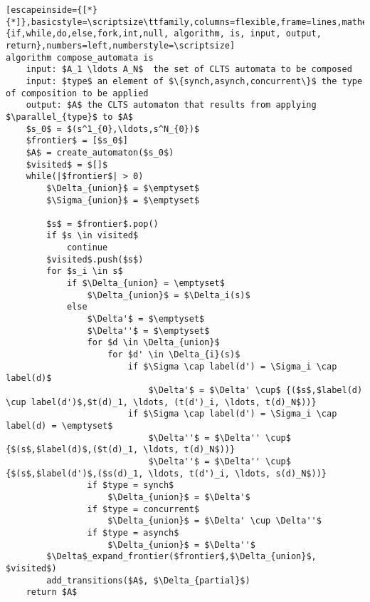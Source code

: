 \renewcommand{\ttdefault}{pcr}
\begin{lstlisting}[escapeinside={[*}{*]},basicstyle=\scriptsize\ttfamily,columns=flexible,frame=lines,mathescape=true,xleftmargin=3.0ex,keywordstyle=\textbf,morekeywords={if,while,do,else,fork,int,null, algorithm, is, input, output, return},numbers=left,numberstyle=\scriptsize]
algorithm compose_automata is
	input: $A_1 \ldots A_N$  the set of CLTS automata to be composed
	input: $type$ an element of $\{synch,asynch,concurrent\}$ the type of composition to be applied
	output: $A$ the CLTS automaton that results from applying $\parallel_{type}$ to $A$
	$s_0$ = $(s^1_{0},\ldots,s^N_{0})$
	$frontier$ = [$s_0$]
	$A$ = create_automaton($s_0$)
	$visited$ = $[]$
	while(|$frontier$| > 0)
		$\Delta_{union}$ = $\emptyset$
		$\Sigma_{union}$ = $\emptyset$		
		
		$s$ = $frontier$.pop()
		if $s \in visited$
			continue
		$visited$.push($s$)
		for $s_i \in s$ 
			if $\Delta_{union} = \emptyset$
				$\Delta_{union}$ = $\Delta_i(s)$
			else 
				$\Delta'$ = $\emptyset$
				$\Delta''$ = $\emptyset$
				for $d \in \Delta_{union}$
					for $d' \in \Delta_{i}(s)$
						if $\Sigma \cap label(d') = \Sigma_i \cap label(d)$
							$\Delta'$ = $\Delta' \cup$ {($s$,$label(d) \cup label(d')$,$t(d)_1, \ldots, (t(d')_i, \ldots, t(d)_N$))}
						if $\Sigma \cap label(d') = \Sigma_i \cap label(d) = \emptyset$
							$\Delta''$ = $\Delta'' \cup$ {$(s$,$label(d)$,($t(d)_1, \ldots, t(d)_N$))}							
							$\Delta''$ = $\Delta'' \cup$ {$(s$,$label(d')$,($s(d)_1, \ldots, t(d')_i, \ldots, s(d)_N$))}
				if $type = synch$
					$\Delta_{union}$ = $\Delta'$
				if $type = concurrent$
					$\Delta_{union}$ = $\Delta' \cup \Delta''$					
				if $type = asynch$
					$\Delta_{union}$ = $\Delta''$					
		$\Delta$_expand_frontier($frontier$,$\Delta_{union}$, $visited$)				
		add_transitions($A$, $\Delta_{partial}$)
	return $A$

\end{lstlisting}
